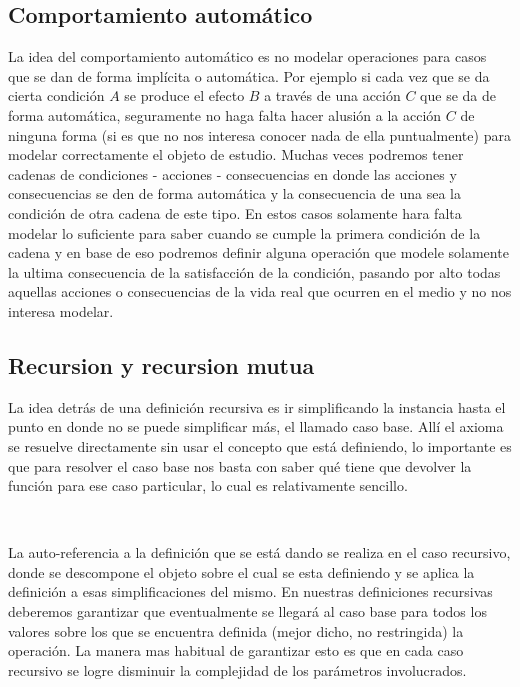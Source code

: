 \documentclass[10pt, a4paper]{report}
\begin{document}
\subsection{Comportamiento autom\'atico}

La idea del comportamiento autom\'atico es no modelar operaciones para casos que se dan de forma impl\'icita o autom\'atica. Por ejemplo si cada vez que se da cierta condici\'on $A$ se produce el efecto $B$ a trav\'es de una acci\'on $C$ que se da de forma autom\'atica, seguramente no haga falta hacer alusi\'on a la acci\'on $C$ de ninguna forma (si es que no nos interesa conocer nada de ella puntualmente) para modelar correctamente el objeto de estudio. Muchas veces podremos tener cadenas de condiciones - acciones - consecuencias en donde las acciones y consecuencias se den de forma autom\'atica y la consecuencia de una sea la condici\'on de otra cadena de este tipo. En estos casos solamente hara falta modelar lo suficiente para saber cuando se cumple la primera condici\'on de la cadena y en base de eso podremos definir alguna operaci\'on que modele solamente la ultima consecuencia de la satisfacci\'on de la condici\'on, pasando por alto todas aquellas acciones o consecuencias de la vida real que ocurren en 
el medio y no nos interesa modelar.

\subsection{Recursion y recursion mutua}

La idea detr\'as de una definici\'on recursiva es ir simplificando la instancia hasta el punto en donde no se puede simplificar m\'as, el llamado caso base. All\'i el axioma se resuelve directamente sin usar el concepto que est\'a definiendo, lo importante es que para resolver el caso base nos basta con saber qu\'e tiene que devolver la funci\'on para ese caso particular, lo cual es relativamente sencillo.

~

La auto-referencia a la definici\'on que se est\'a dando se realiza en el caso recursivo, donde se descompone el objeto sobre el cual se esta definiendo y se aplica la definici\'on a esas simplificaciones del mismo. En nuestras definiciones recursivas deberemos garantizar que eventualmente se llegar\'a al caso base para todos los valores sobre los que se encuentra definida (mejor dicho, no restringida) la operaci\'on. La manera mas habitual de garantizar esto es que en cada caso recursivo se logre disminuir la complejidad de los par\'ametros involucrados.
\end{document}
